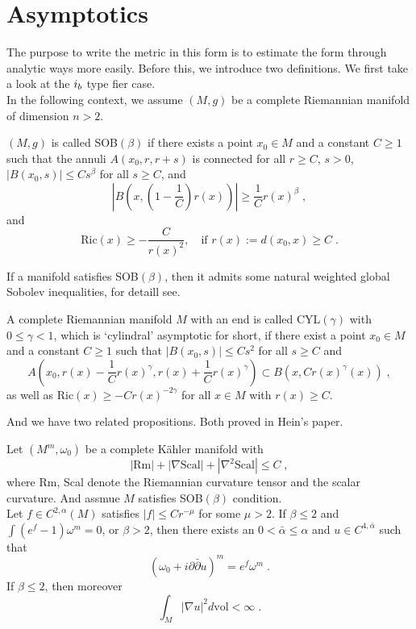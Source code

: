 \section{Asymptotics}
The purpose to write the metric in this form is to estimate the form through analytic ways more easily. Before this, we introduce two definitions. We first take a look at the $\uppercase\expandafter{\romannumeral1}_b$ type fier case. \\ \indent
In the following context, we assume $(M,g)$ be a complete Riemannian manifold of dimension $n>2$.
\begin{defi}
$(M,g)$ is called SOB$(\beta)$ if there exists a point $x_0\in M$ and a constant $C\geq 1$ such that the annuli $A(x_0,r,r+s)$ is connected for all $r\geq C$, $s>0$, $|B(x_0,s)|\leq Cs^\beta$ for all $s\geq C$, and $$\left|B\left(x,\left(1-\frac{1}{C}\right)r(x)\right)\right|\geq\frac{1}{C}r(x)^\beta\; ,$$
and
$$\textrm{Ric}(x)\geq -\frac{C}{r(x)^2},\quad \textrm{if }r(x):=d(x_0,x)\geq C\; .$$
\end{defi}
\indent If a manifold satisfies SOB$(\beta)$, then it admits some natural weighted global Sobolev inequalities, for detaill see\cite{hein2011weighted}.
\begin{defi}
A complete Riemannian manifold $M$ with an end is called CYL$(\gamma)$ with $0\leq\gamma<1$, which is `cylindral' asymptotic for short, if there exist a point $x_0\in M$ and a constant $C\geq 1$ such that $|B(x_0,s)|\leq Cs^2$ for all $s\geq C$ and 
$$A\left(x_0,r(x)-\frac{1}{C}r(x)^\gamma,r(x)+\frac{1}{C}r(x)^\gamma\right)\subset B\left(x,Cr(x)^\gamma(x)\right)\; , $$
as well as Ric$(x)\geq -Cr(x)^{-2\gamma}$ for all $x\in M$ with $r(x)\geq C$.
\end{defi}
And we have two related propositions. Both proved in Hein's paper\cite{hein2012gravitational}\cite{hein2011weighted}.\\ \indent
\begin{prop}
Let $(M^m,\omega_0)$ be a complete K{\"a}hler manifold with
$$|\textrm{Rm}|+|\nabla \textrm{Scal}|+|\nabla^2 \textrm{Scal} |\leq C \; ,$$
where Rm, Scal denote the Riemannian curvature tensor and the scalar curvature. And assmue $M$ satisfies SOB$(\beta)$ condition.\\ \indent
Let $f\in C^{2,\alpha}(M)$ satisfies $|f|\leq Cr^{-\mu}$ for some $\mu>2$. If $\beta\leq 2$ and $\int(e^f-1)\omega^m=0$, or $\beta>2$, then there exists an $0<\bar{\alpha}\leq \alpha$ and $u\in C^{4,\bar{\alpha}}$ such that
$$\left(\omega_0+i\partial\bar{\partial}u  \right)^m=e^f\omega^m\; .$$
If $\beta\leq 2$, then moreover 
$$\int_M|\nabla u|^2 d\mathrm{vol}<\infty\; .$$
\end{prop}
